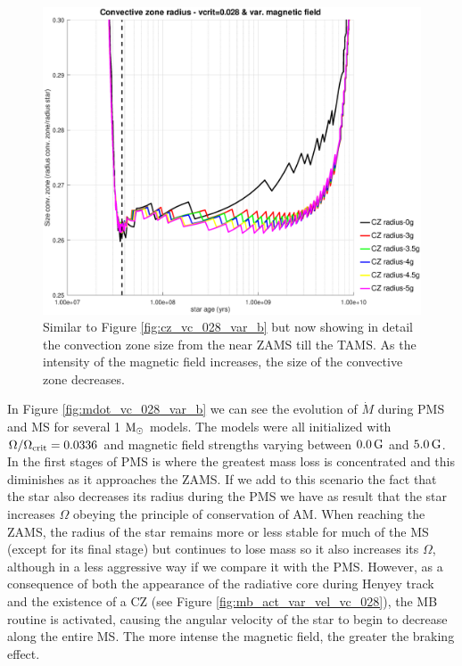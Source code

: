 \documentclass[fleqn,usenatbib]{mnras}
\begin{document}
\begin{figure}
	\includegraphics[trim = 30mm 15mm 20mm 15mm, clip,width=\columnwidth]{figures/cz_vc_028_var_g_z1.eps}
    \caption{Similar to Figure \ref{fig:cz_vc_028_var_b} but now showing in detail the convection zone size from the near ZAMS till the TAMS. As the intensity of the magnetic field increases, the size of the convective zone decreases.}
    \label{fig:cz_vc_028_var_b_z1}
\end{figure}

In Figure \ref{fig:mdot_vc_028_var_b} we can see the evolution of $\Dot{M}$ during PMS and MS for several 1 $\mathrm{M}_\odot$ models. The models were all initialized with $\Omega / \Omega_{\mathrm{crit}}=0.0336$ and magnetic field strengths varying between $0.0\,\mathrm{G}$ and $5.0\,\mathrm{G}$. In the first stages of PMS is where the greatest mass loss is concentrated and this diminishes as it approaches the ZAMS. If we add to this scenario the fact that the star also decreases its radius during the PMS we have as result that the star increases $\Omega$ obeying the principle of conservation of AM. When reaching the ZAMS, the radius of the star remains more or less stable for much of the MS (except for its final stage) but continues to lose mass so it also increases its $\Omega$, although in a less aggressive way if we compare it with the PMS. However, as a consequence of both the appearance of the radiative core during Henyey track and the existence of a CZ (see Figure \ref{fig:mb_act_var_vel_vc_028}), the MB routine is activated, causing the angular velocity of the star to begin to decrease along the entire MS. The more intense the magnetic field, the greater the braking effect.\par 
\end{document}
